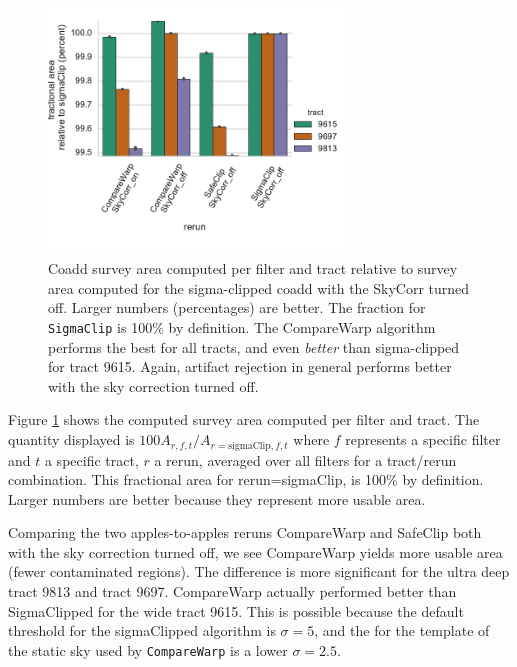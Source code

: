 \documentclass[DM,authoryear,toc]{lsstdoc}
\begin{document}
\begin{figure}
\begin{centering}
\includegraphics[width=0.7\textwidth]{figures/survey_area.pdf}
\par\end{centering}
\caption{\label{fig:area} Coadd survey area computed per filter and tract relative to survey area computed for the sigma-clipped coadd with the SkyCorr turned off.  Larger numbers (percentages) are better.  The fraction for \texttt{SigmaClip} is 100\% by definition. The CompareWarp algorithm performs the best for all tracts, and even \emph{better} than sigma-clipped for tract 9615.  Again, artifact rejection in general performs better with the sky correction turned off. }
\end{figure}

Figure \ref{fig:area} shows the computed survey area computed per filter and tract.
The quantity displayed is $100A_{r,f,t}/A_{r=\mathrm{sigmaClip}, f,t}$ where $f$ represents a specific filter and $t$ a specific tract, $r$ a rerun, averaged over all filters for a tract/rerun combination.  This fractional area for rerun=sigmaClip, is 100\% by definition. Larger numbers are better because they represent more usable area.

Comparing the two apples-to-apples reruns CompareWarp and SafeClip both with the sky correction turned off, we see CompareWarp yields more usable area (fewer contaminated regions).
The difference is more significant for the ultra deep tract 9813 and tract 9697.
CompareWarp actually performed better than SigmaClipped for the wide tract 9615.
This is possible because the default threshold for the sigmaClipped algorithm is $\sigma=5$, and the for the template of the static sky used by \texttt{CompareWarp} is a lower $\sigma=2.5$.
\end{document}
